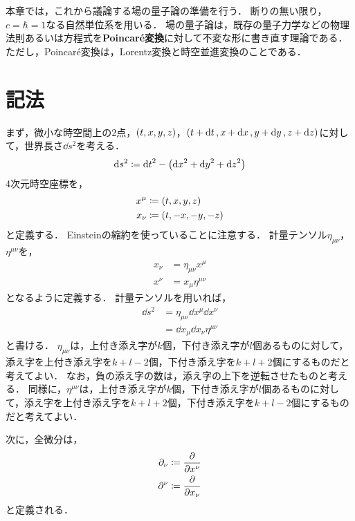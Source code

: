 \documentclass{report}
\begin{document}
  本章では，これから議論する場の量子論の準備を行う．
  断りの無い限り，$c = \hbar = 1$なる自然単位系を用いる．
  場の量子論は，既存の量子力学などの物理法則あるいは方程式を\textbf{Poincar\'e変換}に対して不変な形に書き直す理論である．
  ただし，Poincar\'e変換は，Lorentz変換と時空並進変換のことである．
  \section{記法}
    まず，微小な時空間上の2点，$\qty(t, x, y, z)$，$\qty(t + \dd{t}, x + \dd{x}, y + \dd{y}, z + \dd{z})$に対して，世界長さ$\dd{s^2}$を考える．
    \begin{align}
      \dd{s^2} \coloneqq \dd{t}^2 - \qty(\dd{x}^2 + \dd{y}^2 + \dd{z}^2)
    \end{align}
    4次元時空座標を，
    \begin{align}
      x^{\mu} &\coloneqq \qty(t, x, y, z) \\ 
      x_{\nu} &\coloneqq \qty(t, -x, -y, -z)
    \end{align}
    と定義する．
    Einsteinの縮約を使っていることに注意する．
    計量テンソル$\eta_{\mu\nu}$，$\eta^{\mu\nu}$を，
    \begin{align}
      x_{\nu} &= \eta_{\mu\nu}x^{\mu} \\ 
      x^{\nu} &= x_{\mu}\eta^{\mu\nu}
    \end{align}
    となるように定義する．
    計量テンソルを用いれば，
    \begin{align}
      \dd{s^2} &= \eta_{\mu\nu}\dd{x^{\mu}}\dd{x^{\nu}} \label{def-of-proper-length} \\ 
      &= \dd{x_{\mu}}\dd{x_{\nu}}\eta^{\mu\nu}
    \end{align}
    と書ける．
    $\eta_{\mu\nu}$は，上付き添え字が$k$個，下付き添え字が$l$個あるものに対して，添え字を上付き添え字を$k + l - 2$個，下付き添え字を$k + l + 2$個にするものだと考えてよい．
    なお，負の添え字の数は，添え字の上下を逆転させたものと考える．
    同様に，$\eta^{\mu\nu}$は，上付き添え字が$k$個，下付き添え字が$l$個あるものに対して，添え字を上付き添え字を$k + l + 2$個，下付き添え字を$k + l - 2$個にするものだと考えてよい．
    \par
    次に，全微分は，
    \begin{align}
      \partial_{\nu} &\coloneqq \pdv{x^{\nu}} \\ 
      \partial^{\nu} &\coloneqq \pdv{x_{\nu}} 
    \end{align}
    と定義される．
\end{document}
